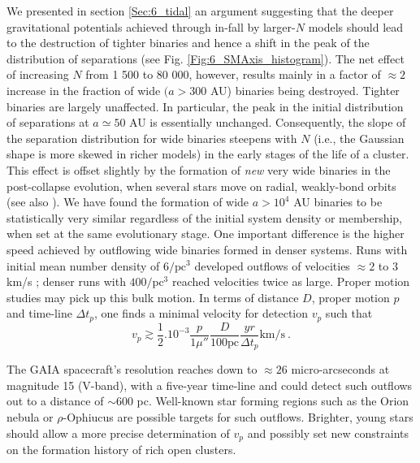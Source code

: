 We presented in section \ref{Sec:6_tidal} an argument suggesting that the deeper gravitational potentials achieved through in-fall by larger-$N$ models should lead to the destruction of tighter binaries and hence a shift in the peak of the distribution of separations (see Fig. \ref{Fig:6_SMAxis_histogram}). The net effect of increasing $N$ from 1 500 to 80 000, however, results mainly in a factor of $\approx 2$ increase in the fraction of wide $(a > 300 $ AU) binaries being destroyed. Tighter binaries are largely unaffected. In particular, the peak in the initial distribution of separations at $a \simeq 50 $ AU is essentially unchanged. Consequently,   the slope of the separation distribution for wide binaries steepens with $N$ (i.e., the Gaussian shape is more skewed in richer models) in the early stages of the life of a cluster.  This effect is offset slightly  by the formation of \textit{new} very wide binaries in the post-collapse evolution, when several stars move on radial, weakly-bond orbits (see also \citealt{Moeckel2011,Kouwenhoven2010}). We have found the formation of wide $a > 10^4$ AU binaries to be statistically very similar regardless of the initial system density or membership, when set at the same evolutionary stage. One important difference is the higher speed achieved by outflowing wide binaries formed in denser systems. Runs with initial mean number density of $6 / \mathrm{pc}^3 $ developed outflows of velocities $\approx 2$ to 3 km/s ; denser runs with $400 / \mathrm{pc}^3$ reached velocities twice as large. Proper motion studies may pick up this bulk motion. In terms of distance $D$, proper motion $p$ and time-line $\Delta t_p$, one finds a minimal velocity for detection $v_p$ such that 
\begin{equation}
v_p \gtrsim \frac{1}{2} . 10^{-3}  \frac{p}{1\mu ''} \frac{D}{100 \mathrm{pc}} \frac{yr}{\Delta t_p} \mathrm{km}/\mathrm{s} \  .
\end{equation}

  The GAIA spacecraft's resolution reaches down to $\approx 26$ micro-arcseconds  at magnitude 15 (V-band), 
 with a five-year time-line and could detect such outflows out to  a distance of $\sim 600 $  pc. Well-known star forming  regions such as the Orion nebula or $\rho$-Ophiucus are possible targets for such outflows. Brighter, young stars  should allow a more precise determination of $v_p$ and possibly set new constraints on the formation history of rich open clusters. 

